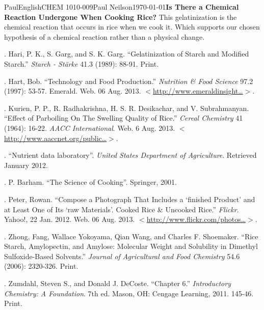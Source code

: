 \documentclass[10pt,twocolumn]{article}
\begin{document}
\begin{mla}{Paul}{English}{CHEM 1010-009}{Paul Neilson}{\today}{\textbf{Is There a Chemical Reaction Undergone When  Cooking Rice?}}
This gelatinization is the chemical reaction that occurs in rice when we cook it. Which supports our chosen hypothesis of a chemical reaction rather than a physical change.

\begin{workscited}

. Hari, P. K., S. Garg, and S. K. Garg. ``Gelatinization of Starch and Modified Starch.'' \textit{Starch - St\"{a}rke} 41.3 (1989): 88-91. Print.

. Hart, Bob. ``Technology and Food Production.'' \textit{Nutrition \& Food Science} 97.2 (1997): 53-57. Emerald. Web. 06 Aug. 2013. $<$\href{http://www.emeraldinsight.com/journals.htm?articleid=866505}{http://www.emeraldinsight\dots}$>$.

. Kurien, P. P., R. Radhakrishna, H. S. R. Desikachar, and V. Subrahmanyan. ``Effect of Parboiling On The Swelling Quality of Rice.'' \textit{Cereal Chemistry} 41 (1964): 16-22. \textit{AACC International}. Web. 6 Aug. 2013. $<$\href{http://www.aaccnet.org/publications/cc/backissues/1964/Documents/chem41_16.pdf}{http://www.aaccnet.org/public\dots}$>$.

. ``Nutrient data laboratory''. \textit{United States Department of Agriculture}. Retrieved January 2012.

. P. Barham. ``The Science of Cooking''. Springer, 2001.

. Peter, Rowan. ``Compose a Photograph That Includes a `finished Product' and at Least One of Its `raw Materials'. Cooked Rice \& Uncooked Rice.'' \textit{Flickr}. Yahoo!, 22 Jan. 2012. Web. 06 Aug. 2013. $<$\href{http://www.flickr.com/photos/rowan_peter/6740181017/}{http://www.flickr.com/photos\dots}$>$.

. Zhong, Fang, Wallace Yokoyama, Qian Wang, and Charles F. Shoemaker. ``Rice Starch, Amylopectin, and Amylose:  Molecular Weight and Solubility in Dimethyl Sulfoxide-Based Solvents.'' \textit{Journal of Agricultural and Food Chemistry} 54.6 (2006): 2320-326. Print.

. Zumdahl, Steven S., and Donald J. DeCoste. ``Chapter 6.'' \textit{Introductory Chemistry: A Foundation}. 7th ed. Mason, OH: Cengage Learning, 2011. 145-46. Print.

\end{workscited}

\end{mla}
\end{document}
